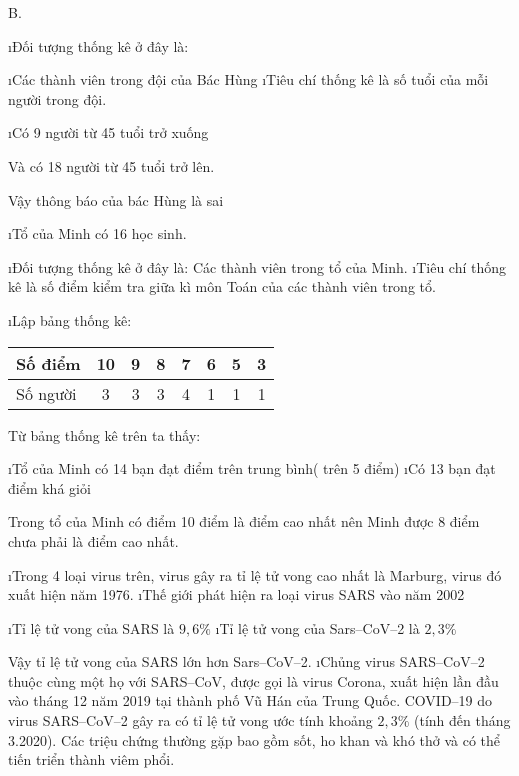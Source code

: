 \begin{Answer}{B.}
		\begin{enumerate}[a),leftmargin=*]
			\i Đối tượng thống kê ở đây là:
			\begin{enumerate}[+,leftmargin=*]
				\i Các thành viên trong đội của Bác Hùng
				\i Tiêu chí thống kê là số tuổi của mỗi người trong đội.
			\end{enumerate}
			\i Có 9 người từ  45 tuổi trở xuống
			
			Và có 18 người từ 45 tuổi trở lên.
			
			Vậy thông báo của bác Hùng là sai
		\end{enumerate}
	
\end{Answer}
\begin{Answer}{1}
		\begin{enumerate}[a),leftmargin=*]
			\i Tổ của Minh có 16  học sinh.
			\begin{enumerate}[--,leftmargin=*]
				\i Đối tượng thống kê ở đây là: Các thành viên trong tổ của Minh.
				\i Tiêu chí thống kê là số điểm kiểm tra giữa kì môn Toán của các thành viên trong tổ.
			\end{enumerate}
			\i Lập bảng thống kê:
			\begin{center}
				\begin{tabular}{|l|c|c|c|c|c|c|c|}
					\hline
					Số điểm & 10 & 9&8&7&6&5&3\\
					\hline
					Số người& 3&3&3&4&1&1&1\\
					\hline
				\end{tabular}
			\end{center}	
			Từ bảng thống kê trên ta thấy:
			\begin{enumerate}[+,leftmargin=*]
				\i Tổ của Minh có 14  bạn đạt điểm trên trung bình( trên 5 điểm)
				\i Có 13 bạn đạt điểm khá giỏi
			\end{enumerate}
			Trong tổ của Minh có điểm 10 điểm là điểm cao nhất nên Minh được 8 điểm chưa phải là điểm cao nhất.
		\end{enumerate}
	
\end{Answer}
\begin{Answer}{2}
		\begin{enumerate}[a),leftmargin=*]
			\i Trong 4 loại virus trên, virus gây ra tỉ lệ tử vong cao nhất là Marburg, virus đó xuất hiện năm 1976.
			\i Thế giới phát hiện ra loại virus SARS vào năm 2002
			\begin{enumerate}[+,leftmargin=*]
				\i Tỉ lệ tử vong của SARS là  $9,6\%$
				\i Tỉ lệ tử vong của Sars--CoV--2 là $2,3 \%$
			\end{enumerate}
			Vậy tỉ lệ tử vong của SARS lớn hơn Sars--CoV--2.
			\i Chủng virus SARS--CoV--2 thuộc cùng một họ với SARS--CoV, được gọi là virus Corona, xuất hiện lần đầu vào tháng 12 năm 2019 tại thành phố Vũ Hán của Trung Quốc. COVID--19 do virus SARS--CoV--2 gây ra có tỉ lệ tử vong ước tính khoảng $2,3\%$ (tính đến tháng 3.2020). Các triệu chứng thường gặp bao gồm sốt, ho khan và khó thở và có thể tiến triển thành viêm phổi.
		\end{enumerate}
	
\end{Answer}

